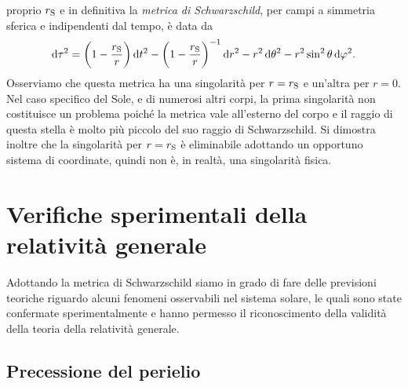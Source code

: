 proprio $r_{\textup{S}}$ e in definitiva la
\emph{metrica di Schwarzschild}, per campi a
simmetria sferica e indipendenti dal tempo, è data da
\begin{equation}
  \label{eq:metrica-schwarzschild}
  \mathop{}\!\mathrm{d}\tau^{2} = \bigg(1 - \frac{r_{\textup{S}}}{r} \bigg) \mathop{}\!\mathrm{d} t^{2} - \bigg(1 -
  \frac{r_{\textup{S}}}{r}\bigg)^{-1}\mathop{}\!\mathrm{d} r^{2} - r^{2}\mathop{}\!\mathrm{d}\theta^{2} -
  r^{2}\sin^{2}\theta \mathop{}\!\mathrm{d}\varphi^{2}.
\end{equation}
Osserviamo che questa metrica ha una singolarità per $r = r_{\textup{S}}$ e
un'altra per $r = 0$.  Nel caso specifico del Sole, e di numerosi altri corpi,
la prima singolarità non costituisce un problema poiché la metrica vale
all'esterno del corpo e il raggio di questa stella è molto più piccolo del suo
raggio di Schwarzschild.  Si dimostra inoltre che la singolarità per
$r = r_{\textup{S}}$ è eliminabile adottando un opportuno sistema di coordinate,
quindi non è, in realtà, una singolarità fisica.

\section{Verifiche sperimentali della relatività generale}
\label{sec:verififiche-relativita}

Adottando la metrica di Schwarzschild siamo in grado di fare delle previsioni
teoriche riguardo alcuni fenomeni osservabili nel sistema solare, le quali sono
state confermate sperimentalmente e hanno permesso il riconoscimento della
validità della teoria della relatività generale.

\subsection{Precessione del perielio}
\label{sec:precessione-perielio}

